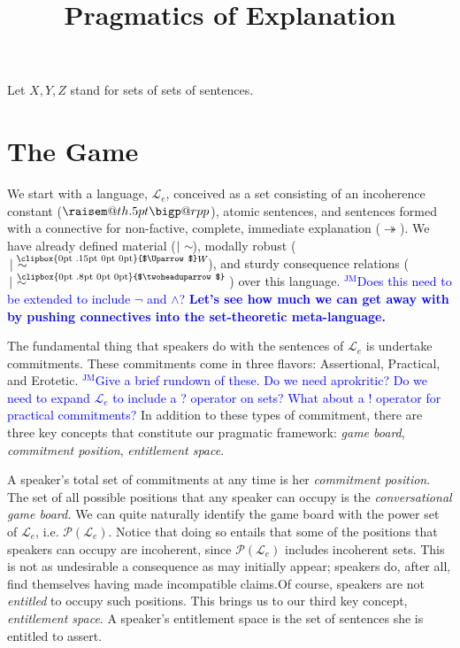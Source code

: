 \documentclass{article}                     %
\makeatletter
\theoremstyle{definition}
\newcommand{\ee}{\twoheadrightarrow}
\newcounter{fncntr}
\newcommand{\fnmark}[1]{\refstepcounter{fncntr}\label{#1}\footnotemark[\getrefnumber{#1}]}
\newcommand{\raisemath}[1]{\mathpalette{\raisem@th{#1}}}
\newcommand{\raisem@th}[3]{\raisebox{#1}{$#2#3$}}
\newcommand{\Uuparrow}{%
	\raisebox{.2ex}{\clipbox{0pt .15pt 0pt 0pt}{$\Uparrow$}}
}
\newcommand{\thuarrow}{%
	\raisebox{.05ex}{\clipbox{0pt .8pt 0pt 0pt}{$\twoheaduparrow$}}
}
\newcommand{\nms}{%
	\mathbin{\mathpalette\@nms\expandafter}
}
\newcommand{\@nms}{\mid\joinrel\mkern-.5mu\sim}
\newcommand{\nmc}{%
	\mathbin{\mathpalette\nm@\expandafter}
}
\newcommand{\nm@}{\mid\joinrel\mkern-.5mu\sim\mkern-3mu}
\newcommand{\mrc}[1]{\mathbin{
		\mathchoice
		{\normalsize\hspace{.5mm}\nms^{\mkern-19mu\scriptsize\Uuparrow#1}\hspace{-.5mm}}
		{\normalsize\hspace{.5mm}\nms^{\mkern-19mu\scriptsize\Uuparrow#1}\hspace{-.5mm}}
		{\footnotesize\hspace{.5mm}\nms^{\mkern-13.5mu\fontsize{5.5}{0}\Uuparrow#1}}
		{\scriptsize\nms^{\mkern-10mu\tiny\Uuparrow#1}}
	}
}
\newcommand{\smc}{\mathbin{
		\mathchoice
		{\hspace{.4mm}\nms^{\mkern-17mu\scriptsize\thuarrow}\hspace{.6mm}}
		{\hspace{.4mm}\nms^{\mkern-17mu\scriptsize\thuarrow}\hspace{.6mm}}
		{\footnotesize\hspace{.4mm}\nms^{\mkern-11mu\tiny\thuarrow}\hspace{.6mm}}
		{\scriptsize\nms^{\mkern-10mu\tiny\thuarrow}}
	}
}
\newcommand{\bigperpp}{%
	\mathop{\mathpalette\bigp@rpp\relax}%
	\displaylimits
}
\newcommand{\bigp@rpp}[2]{%
	\vcenter{
		\m@th\hbox{\scalebox{\ifx#1\displaystyle1.15\else1.15\fi}{$#1\perp$}}
	}%
}
\newcommand{\bigperp}{\raisemath{.5pt}{\bigperpp}}
\newcommand{\jm}[1]{\textcolor{blue}{$^{\textrm{JM}}${#1}}}
\makeatother
\begin{document}
\sloppy
\title{Pragmatics of Explanation}

\raggedbottom

\maketitle




Let $X, Y, Z$ stand for sets of sets of sentences.

\section{The Game}

We start with a language, $ \mathcal{L}_e $, conceived as a set consisting of an incoherence constant ($ \bigperp $), atomic sentences, and sentences formed with a connective for non-factive, complete, immediate explanation ($ \ee $). We have already defined material ($ \nmc $), modally robust ($ \mrc{W} $), and sturdy consequence relations ($ \smc $) over this language. \jm{Does this need to be extended to include $ \neg $ and $ \wedge $? \textbf{Let's see how much we can get away with by pushing connectives into the set-theoretic meta-language.}}

The fundamental thing that speakers do with the sentences of $ \mathcal{L}_e $ is undertake commitments. These commitments come in three flavors: Assertional, Practical, and Erotetic. \jm{Give a brief rundown of these. Do we need aprokritic? Do we need to expand $ \mathcal{L}_e $ to include  a ? operator on sets? What about a ! operator for practical commitments?} In addition to these types of commitment, there are three key concepts that constitute our pragmatic framework: \textit{game board}, \textit{commitment position}, \textit{entitlement space}.



A speaker's total set of commitments at any time is her \textit{commitment position}. The set of all possible positions that any speaker can occupy is the \textit{conversational game board.} We can quite naturally identify the game board with the power set of $ \mathcal{L}_e $, i.e. $\mathcal{P}(\mathcal{L}_e) $. Notice that doing so entails that some of the positions that speakers can occupy are incoherent, since $\mathcal{P}(\mathcal{L}_e)$ includes incoherent sets. This is not as undesirable a consequence as may initially appear; speakers do, after all, find themselves having made incompatible claims.\fnmark{ContrastPW}  Of course, speakers are not \textit{entitled} to occupy such positions. This brings us to our third key concept, \textit{entitlement space}. A speaker's entitlement space is the set of sentences she is entitled to assert. 
\end{document}
